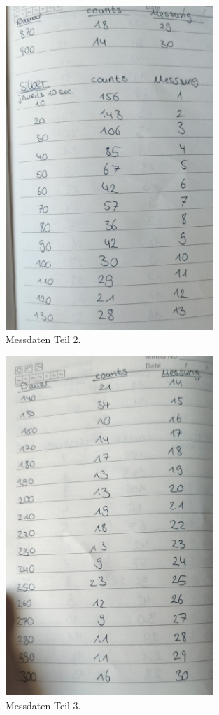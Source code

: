 \begin{figure}
    \centering
    \includegraphics[width=0.7\textwidth]{Bilder/2.jpeg}
    \caption{Messdaten Teil 2.}
    \label{fig:M1}
\end{figure}

\begin{figure}
    \centering
    \includegraphics[width=0.7\textwidth]{Bilder/3.jpeg}
    \caption{Messdaten Teil 3.}
    \label{fig:M1}
\end{figure}

